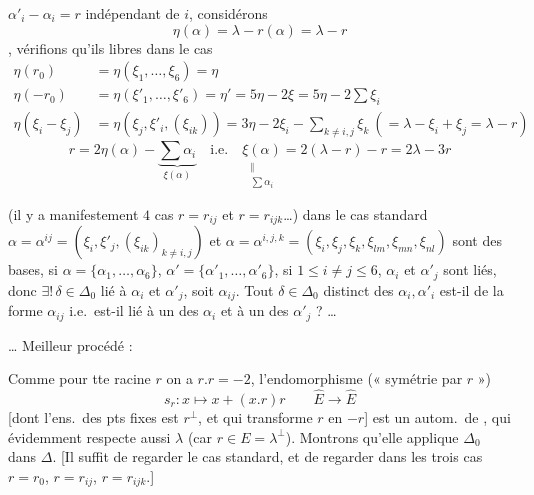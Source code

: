 \documentclass[11pt,a4paper]{article}
\begin{document}
$\boxed{\alpha'_i - \alpha_i = r}$ indépendant de $i$, considérons
\[
\eta(\alpha) = \lambda - r(\alpha) = \lambda - r
\]
, vérifions qu'ils
  libres \ill{} dans le
cas
\[
\begin{aligned}
\eta(r_0) &= \eta(\xi_1, \dots, \xi_6) = \eta \\
\eta(-r_0) &= \eta(\xi'_1, \dots, \xi'_6) = \eta' = 5\eta - 2\xi = 5\eta - 2\textstyle\sum \xi_i \\
\eta(\xi_i - \xi_j) &= \eta(\xi_j, \xi'_i, (\xi_{ik})) = 3\eta - 2\xi_i - \textstyle\sum_{k \neq i,j} \xi_k \ (= \lambda - \xi_i + \xi_j = \lambda - r)
\end{aligned}
\]
\struck{$\eta(\alpha)$}
\[
r = 2\eta(\alpha) - \underbrace{\sum \alpha_i}_{\xi(\alpha)}
\quad \text{i.e.} \quad
\underset{\substack{\Vert \\ \sum \alpha_i}}{\xi(\alpha)} = 2(\lambda - r) - r = 2\lambda - 3r
\]

(il y a manifestement $4$ cas  $r = r_{ij}$ et
$r = r_{ijk}$…) dans le cas standard
$\alpha = \alpha^{ij} = (\xi_i, \xi'_j, (\xi_{ik})_{k \neq i,j})$ et
$\alpha = \alpha^{i,j,k} = (\xi_i, \xi_j, \xi_k, \xi_{lm}, \xi_{mn}, \xi_{nl})$
sont des bases,   si $\alpha = \{\alpha_1, \dots,
\alpha_6\}$, $\alpha' = \{\alpha'_1, \dots, \alpha'_6\}$,
si $1 \leq i \neq j \leq 6$, $\alpha_i$ et $\alpha'_j$ sont liés, donc
$\exists!\, \delta \in \Delta_0$ lié à $\alpha_i$ et $\alpha'_j$, soit
$\alpha_{ij}$.  Tout $\delta \in \Delta_0$ distinct
des $\alpha_i, \alpha'_i$ est-il de la forme $\alpha_{ij}$ i.e.\ est-il lié à
un des $\alpha_i$ et à un des $\alpha'_j$ ? …

… Meilleur procédé :

Comme pour tte racine $r$ on a $r.r = -2$, l'endomorphisme (« symétrie par
$r$ »)
\[
s_r : x \longmapsto x + (x.r)r \qquad \widehat{E} \to \widehat{E}
\]
[dont l'ens.\ des pts fixes est $r^\perp$, et qui transforme $r$ en $-r$]
est un autom.\ de  , qui
évidemment respecte aussi $\lambda$ (car $r \in E = \lambda^\perp$).
Montrons qu'elle applique $\Delta_0$ dans $\Delta$. [Il suffit de regarder le
cas standard, et de regarder dans les trois cas $r = r_0$, $r = r_{ij}$, $r =
r_{ijk}$.]
\end{document}
